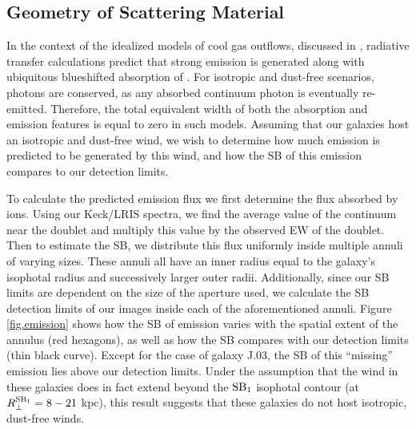 \documentclass[twocolumn]{aastex61}
\begin{document}


\subsection{Geometry of Scattering Material}
In the context of the idealized models of cool gas outflows, discussed in \cite{Prochaska_2011}, radiative transfer calculations predict that strong  emission is generated along with ubiquitous blueshifted absorption of . For isotropic and dust-free scenarios, photons are conserved, as any absorbed continuum photon is eventually re-emitted.  Therefore, the total equivalent width of both the absorption and emission features is equal to zero in such models. Assuming that our galaxies host an isotropic and dust-free wind, we wish to determine how much emission is predicted to be generated by this wind, and how the SB of this emission compares to our detection limits.

To calculate the predicted emission flux we first determine the flux absorbed by  ions. Using our Keck/LRIS spectra, we find the average value of the continuum near the  doublet and multiply this value by the observed EW of the doublet. Then to estimate the SB, we distribute this flux uniformly inside multiple annuli of varying sizes. These annuli all have an inner radius equal to the galaxy's isophotal radius and successively larger outer radii.  Additionally, since our SB limits are dependent on the size of the aperture used, we calculate the SB detection limits of our images inside each of the aforementioned annuli. Figure \ref{fig.emission} shows how the SB of emission varies with the spatial extent of the annulus (red hexagons), as well as how the SB compares with our detection limits (thin black curve). Except for the case of galaxy J.03, the SB of this ``missing'' emission lies above our detection limits. 
Under the assumption that the wind in these galaxies does in fact extend beyond the $\rm SB_1$ isophotal contour (at $R_{\perp}^{\rm{SB}_1} = 8-21$ kpc), this result suggests that these galaxies do not host isotropic, dust-free winds.  
\end{document}
